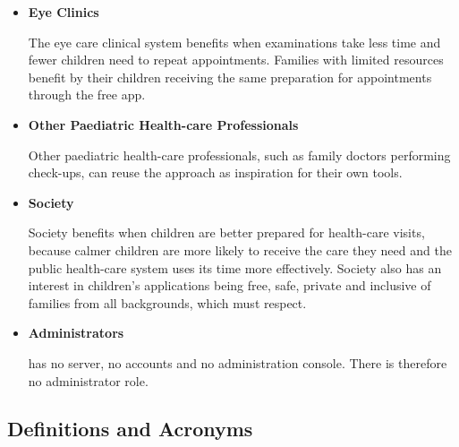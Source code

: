 \documentclass[10pt]{article}
\begin{document}
\begin{itemize}
\item \textbf{Eye Clinics} 

The eye care clinical system benefits when examinations take less time and fewer children need 
to repeat appointments. Families with limited resources benefit by their children receiving the same preparation 
for appointments through the free app. 

\item \textbf{Other Paediatric Health-care Professionals} 

Other paediatric health-care professionals, such as family doctors performing check-ups, can reuse the approach as inspiration for their own tools.

\item \textbf{Society}

Society benefits when children are better prepared for health-care visits, because calmer children are
more likely to receive the care they need and the public health-care system uses its time more effectively.
Society also has an interest in children's applications being free, safe, private and inclusive of families
from all backgrounds, which \progname{} must respect.

\item \textbf{Administrators} 

\progname{} has no server, no accounts and no administration console. There is
therefore no administrator role.
\end{itemize}

\subsection{Definitions and Acronyms} \label{sec_DefinitionsAndAcronyms}

\renewcommand{\arraystretch}{1.3}
\end{document}
